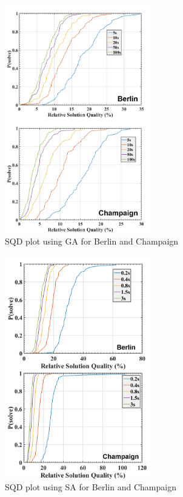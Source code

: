 \begin{figure}
\includegraphics[width=2.5in]{F3-GA-SQD}
\caption{SQD plot using GA for Berlin and Champaign}
\label{fig: GA-SQD}
\end{figure}

\begin{figure}
\includegraphics[width=2.5in]{F4-SA-SQD}
\caption{SQD plot using SA for Berlin and Champaign}
\label{fig: SA-SQD}
\end{figure}




